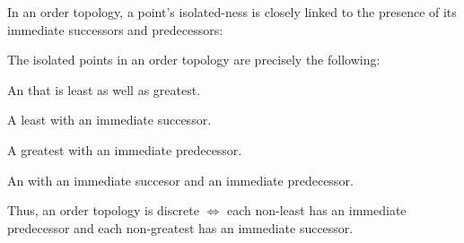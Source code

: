 	
	In an order topology, a point's isolated-ness is closely linked to the presence of its immediate successors and predecessors:
	
	\begin{lem}
		The isolated points in an order topology are precisely the following:
		\begin{mylist}
			\item An \elt that is least as well as greatest.
			\item A least \elt with an immediate successor.
			\item A greatest \elt with an immediate predecessor.
			\item An \elt with an immediate succesor and an immediate predecessor.
		\end{mylist}
		
		Thus, an order topology is discrete $\iff$ each non-least \elt has an immediate predecessor and each non-greatest \elt has an immediate successor.
	\end{lem}
	
